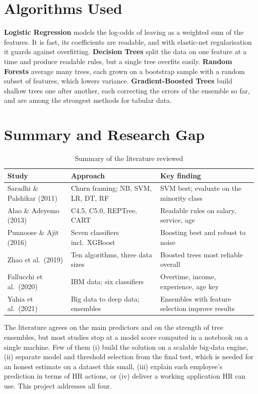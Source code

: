 \documentclass[12pt,a4paper]{report}
\begin{document}
\section{Algorithms Used}

\textbf{Logistic Regression} models the log-odds of leaving as a weighted sum of the features. It is fast, its coefficients are readable, and with elastic-net regularisation it guards against overfitting. \textbf{Decision Trees} split the data on one feature at a time and produce readable rules, but a single tree overfits easily. \textbf{Random Forests} \cite{breiman2001random} average many trees, each grown on a bootstrap sample with a random subset of features, which lowers variance. \textbf{Gradient-Boosted Trees} \cite{friedman2001greedy} build shallow trees one after another, each correcting the errors of the ensemble so far, and are among the strongest methods for tabular data.

\section{Summary and Research Gap}

\begin{table}[H]
\centering
\caption{Summary of the literature reviewed}
\label{tab:lit}
\small
\begin{tabularx}{\textwidth}{|P{3.2cm}|L|L|}
\hline
\textbf{Study} & \textbf{Approach} & \textbf{Key finding} \\ \hline
Saradhi \& Palshikar (2011) & Churn framing; NB, SVM, LR, DT, RF & SVM best; evaluate on the minority class \\ \hline
Alao \& Adeyemo (2013) & C4.5, C5.0, REPTree, CART & Readable rules on salary, service, age \\ \hline
Punnoose \& Ajit (2016) & Seven classifiers incl.\ XGBoost & Boosting best and robust to noise \\ \hline
Zhao et al.\ (2019) & Ten algorithms, three data sizes & Boosted trees most reliable overall \\ \hline
Fallucchi et al.\ (2020) & IBM data; six classifiers & Overtime, income, experience, age key \\ \hline
Yahia et al.\ (2021) & Big data to deep data; ensembles & Ensembles with feature selection improve results \\ \hline
\end{tabularx}
\end{table}

The literature agrees on the main predictors and on the strength of tree ensembles, but most studies stop at a model score computed in a notebook on a single machine. Few of them (i) build the solution on a scalable big-data engine, (ii) separate model and threshold selection from the final test, which is needed for an honest estimate on a dataset this small, (iii) explain each employee's prediction in terms of HR actions, or (iv) deliver a working application HR can use. This project addresses all four.
\end{document}
